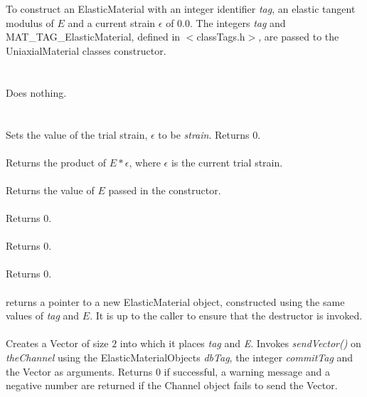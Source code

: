   \\
  \\
To construct an ElasticMaterial with an integer identifier {\em
tag}, an elastic tangent modulus of $E$ and a current strain
$\epsilon$ of $0.0$. The integers {\em tag} and
MAT\_TAG\_ElasticMaterial, defined in $<$classTags.h$>$, are passed 
to the UniaxialMaterial classes constructor. \\

 \\
\\ 
Does nothing. \\

 \\
  \\
Sets the value of the trial strain, $\epsilon$ to be {\em
strain}. Returns $0$.\\

 \\
Returns the product of $E * \epsilon$, where $\epsilon$ is the current
trial strain. \\

 \\
Returns the value of $E$ passed in the constructor. \\

 \\
Returns $0$. \\

 \\
Returns $0$. \\

 \\
Returns $0$. \\

 \\
returns a pointer to a new ElasticMaterial object, constructed
using the same values of {\em tag} and $E$. It is up to the caller to
ensure that the destructor is invoked. \\

\\
Creates a Vector of size $2$ into which it places  {\em tag} and
{\em E}. Invokes {\em sendVector()} on  {\em theChannel} using the
ElasticMaterialObjects {\em dbTag}, the integer {\em commitTag} and
the Vector as arguments. Returns $0$ if successful, a warning message
and a negative number are returned if the Channel object fails to send
the Vector. \\

